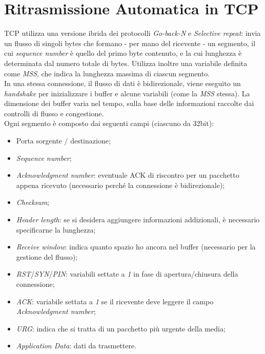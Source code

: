 \section{Ritrasmissione Automatica in TCP}
TCP utilizza una versione ibrida dei protocolli \textit{Go-back-N} e \textit{Selective repeat}: invia un flusso di singoli bytes che formano - per mano del ricevente - un segmento, il cui \textit{sequence number} è quello del primo byte contenuto, e la cui lunghezza è determinata dal numero totale di bytes. Utilizza inoltre una variabile definita come \textit{MSS}, che indica la lunghezza massima di ciascun segmento. \\
In una stessa connessione, il flusso di dati è bidirezionale, viene eseguito un \textit{handshake} per inizializzare i buffer e alcune variabili (come la \textit{MSS} stessa). La dimensione dei buffer varia nel tempo, sulla base delle informazioni raccolte dai controlli di flusso e congestione. \\
Ogni segmento è composto dai seguenti campi (ciascuno da 32bit):
\begin{itemize}
	\item Porta sorgente / destinazione;
	\item \textit{Sequence number};
	\item \textit{Acknowledgment number}: eventuale ACK di riscontro per un pacchetto appena ricevuto (necessario perché la connessione è bidirezionale);
	\item \textit{Checksum};
	\item \textit{Header length}: se si desidera aggiungere informazioni addizionali, è necessario specificarne la lunghezza;
	\item \textit{Receive window}: indica quanto spazio ho ancora nel buffer (necessario per la gestione del flusso);
	\item \textit{RST}/\textit{SYN}/\textit{PIN}: variabili settate a \textit{1} in fase di apertura/chiusura della connessione;
	\item \textit{ACK}: variabile settata a \textit{1} se il ricevente deve leggere il campo \textit{Acknowledgment number};
	\item \textit{URG}: indica che si tratta di un pacchetto più urgente della media;
	\item \textit{Application Data}: dati da trasmettere.
\end{itemize}

